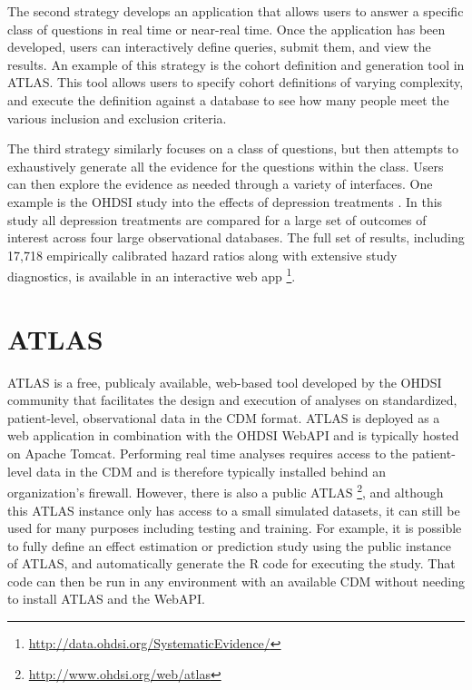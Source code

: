 \documentclass[11pt]{book}
\let\rmarkdownfootnote\footnote%
\def\footnote{\protect\rmarkdownfootnote}
\theoremstyle{definition}
\theoremstyle{definition}
\theoremstyle{definition}
\theoremstyle{remark}
\begin{document}
The second strategy develops an application that allows users to answer a specific class of questions in real time or near-real time. Once the application has been developed, users can interactively define queries, submit them, and view the results. An example of this strategy is the cohort definition and generation tool in ATLAS. This tool allows users to specify cohort definitions of varying complexity, and execute the definition against a database to see how many people meet the various inclusion and exclusion criteria.

The third strategy similarly focuses on a class of questions, but then attempts to exhaustively generate all the evidence for the questions within the class. Users can then explore the evidence as needed through a variety of interfaces. One example is the OHDSI study into the effects of depression treatments \citep{schuemie_2018b}. In this study all depression treatments are compared for a large set of outcomes of interest across four large observational databases. The full set of results, including 17,718 empirically calibrated hazard ratios along with extensive study diagnostics, is available in an interactive web app \footnote{\url{http://data.ohdsi.org/SystematicEvidence/}}.

\hypertarget{atlas}{%
\section{ATLAS}\label{atlas}}

ATLAS is a free, publicaly available, web-based tool developed by the OHDSI community that facilitates the design and execution of analyses on standardized, patient-level, observational data in the CDM format. ATLAS is deployed as a web application in combination with the OHDSI WebAPI and is typically hosted on Apache Tomcat. Performing real time analyses requires access to the patient-level data in the CDM and is therefore typically installed behind an organization's firewall. However, there is also a public ATLAS \footnote{\url{http://www.ohdsi.org/web/atlas}}, and although this ATLAS instance only has access to a small simulated datasets, it can still be used for many purposes including testing and training. For example, it is possible to fully define an effect estimation or prediction study using the public instance of ATLAS, and automatically generate the R code for executing the study. That code can then be run in any environment with an available CDM without needing to install ATLAS and the WebAPI.
\end{document}
